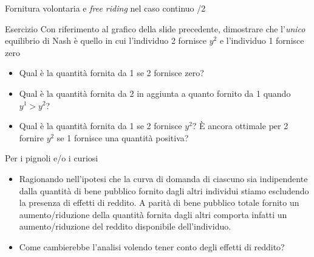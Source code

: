 \documentclass[aspectratio=64,12pt]{beamer}
\begin{document}
\begin{frame}{Fornitura volontaria e \emph{free riding} nel caso continuo /2}
\begin{block}{Esercizio}
\small
Con riferimento al grafico della slide precedente, dimostrare che l'\emph{unico}
equilibrio di Nash è quello in cui l'individuo 2 fornisce $y^{2}$ e
l'individuo 1 fornisce zero
\end{block}
\vspace{-2mm}
\small
\begin{itemize}
\item Qual è la quantità fornita da 1 se 2 fornisce zero?
\item Qual è la quantità fornita da 2 in aggiunta a quanto fornito da 1
quando $y^{1}>y^{2}$?
\item Qual è la quantità fornita da 1 se 2 fornisce $y^{2}$? È ancora
ottimale per 2 fornire $y^{2}$ se 1 fornisce una quantità positiva?
\end{itemize}

\begin{block}{Per i pignoli e/o i curiosi}
\footnotesize
\begin{itemize}
\item Ragionando nell'ipotesi che la curva di domanda di ciascuno sia
  indipendente dalla quantità di bene pubblico fornito dagli altri individui
  stiamo escludendo la presenza di effetti di reddito. A parità di bene
  pubblico totale fornito un aumento/riduzione della quantità fornita dagli
  altri comporta infatti un aumento/riduzione del reddito disponibile
  dell'individuo.
\item Come cambierebbe l'analisi volendo tener conto degli effetti di reddito?
\end{itemize}
\end{block}
\end{frame}
\end{document}
